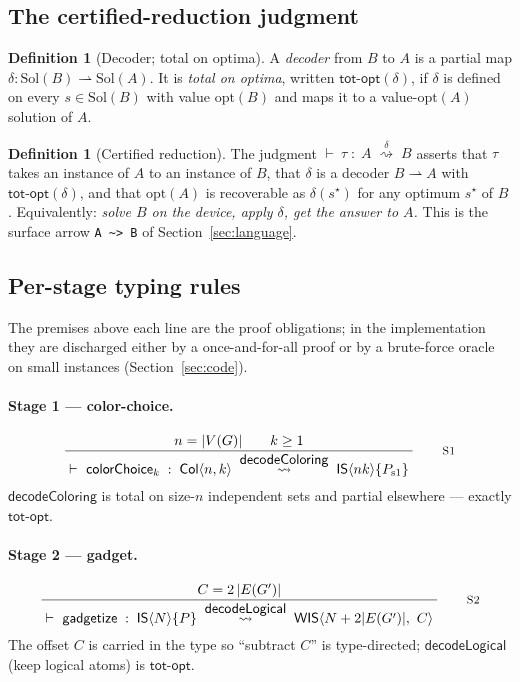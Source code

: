 \documentclass[11pt]{article}
\theoremstyle{definition}
\newtheorem{definition}[theorem]{Definition}
\theoremstyle{remark}
\newcommand{\Col}{\mathsf{Col}}
\newcommand{\ISt}{\mathsf{IS}}
\newcommand{\WIS}{\mathsf{WIS}}
\newcommand{\Sol}{\mathrm{Sol}}
\newcommand{\totopt}{\mathsf{tot\text{-}opt}}
\newcommand{\rn}[1]{\textsc{\footnotesize #1}}
\newcommand{\irule}[2]{\ensuremath{\dfrac{\;#1\;}{\;#2\;}}}
\newcommand{\redto}[1]{\mathrel{\overset{\textstyle #1}{\rightsquigarrow}}}
\begin{document}
\subsection{The certified-reduction judgment}
\label{sec:judgment}

\begin{definition}[Decoder; total on optima]
A \emph{decoder} from $B$ to $A$ is a partial map
$\delta:\Sol(B)\rightharpoonup\Sol(A)$. It is \emph{total on optima}, written
$\totopt(\delta)$, if $\delta$ is defined on every $s\in\Sol(B)$ with value
$\mathrm{opt}(B)$ and maps it to a value-$\mathrm{opt}(A)$ solution of $A$.
\end{definition}

\begin{definition}[Certified reduction]
The judgment $\vdash\ \tau \;:\; A \;\redto{\delta}\; B$ asserts that $\tau$ takes an
instance of $A$ to an instance of $B$, that $\delta$ is a decoder $B\!\rightharpoonup\!A$
with $\totopt(\delta)$, and that $\mathrm{opt}(A)$ is recoverable as $\delta(s^\star)$
for any optimum $s^\star$ of $B$. Equivalently: \emph{solve $B$ on the device, apply
$\delta$, get the answer to $A$.} This is the surface arrow \texttt{A \~{}> B} of
Section~\ref{sec:language}.
\end{definition}

\subsection{Per-stage typing rules}
\label{sec:stages}

The premises above each line are the proof obligations; in the implementation they are
discharged either by a once-and-for-all proof or by a brute-force oracle on small
instances (Section~\ref{sec:code}).

\paragraph{Stage 1 --- color-choice.}
\[
  \irule{n=|V(G)| \qquad k\ge 1}
        {\vdash\ \mathsf{colorChoice}_k \;:\; \Col\langle n,k\rangle
          \;\redto{\mathsf{decodeColoring}}\; \ISt\langle nk\rangle\{P_{\mathrm{s1}}\}}
  \qquad\rn{S1}
\]
$\mathsf{decodeColoring}$ is total on size-$n$ independent sets and partial elsewhere ---
exactly $\totopt$.

\paragraph{Stage 2 --- gadget.}
\[
  \irule{C = 2\,|E(G')|}
        {\vdash\ \mathsf{gadgetize} \;:\; \ISt\langle N\rangle\{P\}
          \;\redto{\mathsf{decodeLogical}}\; \WIS\langle N+2|E(G')|,\ C\rangle}
  \qquad\rn{S2}
\]
The offset $C$ is carried in the type so ``subtract $C$'' is type-directed;
$\mathsf{decodeLogical}$ (keep logical atoms) is $\totopt$.
\end{document}
